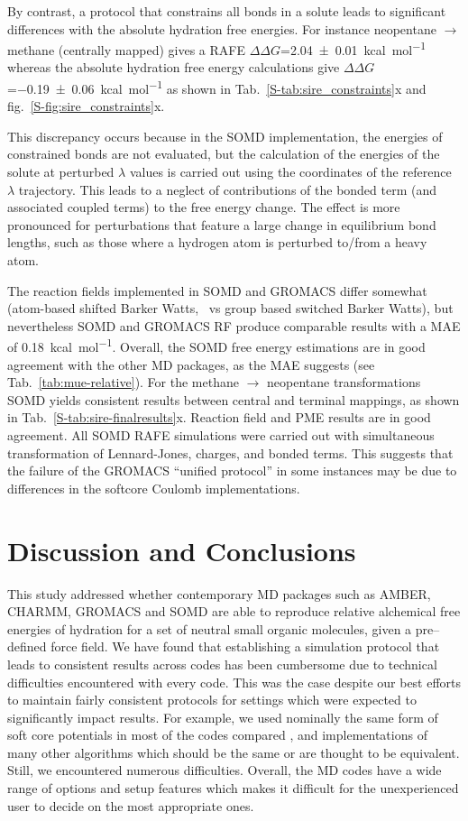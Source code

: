 \documentclass[journal=jctcce,manuscript=article]{achemso}
\begin{document}
By contrast, a protocol that constrains all bonds in a solute leads to
significant differences with the absolute hydration free energies. For instance
neopentane $\rightarrow$ methane (centrally mapped) gives a RAFE
$\Delta\Delta G$=\SI{2.04 +- 0.01}{kcal.mol^{-1}}  whereas the absolute
hydration free energy calculations give $\Delta\Delta
G$=\SI{-0.19+-0.06}{kcal.mol^{-1}} as shown in
Tab.~\ref{S-tab:sire_constraints}x and fig.~\ref{S-fig:sire_constraints}x.

This discrepancy occurs because in the SOMD implementation, the energies of constrained bonds are not evaluated, but the calculation of the energies of the solute at perturbed $\lambda$ values is carried out using the coordinates of the reference $\lambda$ trajectory. This leads to a neglect of contributions of
the bonded term (and associated coupled terms) to the free energy change. The effect is more pronounced for perturbations that feature a large change in equilibrium bond lengths, such as those where a hydrogen atom is perturbed
to/from a heavy atom.

The reaction fields implemented in SOMD and GROMACS differ somewhat (atom-based
shifted Barker Watts,~\cite{doi:10.1080/00268977300102101} vs group based switched Barker Watts), but nevertheless SOMD and GROMACS RF produce comparable results with a MAE of \SI{0.18}{kcal.mol^{-1}}. Overall, the SOMD free energy estimations are in good agreement with the other MD packages, as the MAE suggests (see Tab.~\ref{tab:mue-relative}). For the methane $\rightarrow$ neopentane transformations SOMD yields consistent results between central and terminal mappings, as shown in Tab.~\ref{S-tab:sire-finalresults}x.
Reaction field and PME results are in good agreement.  All SOMD RAFE simulations were carried out with simultaneous transformation of Lennard-Jones, charges, and bonded terms. This suggests that the failure of the GROMACS ``unified protocol'' in some instances may be due to differences in the softcore Coulomb implementations.


\section{Discussion and Conclusions}
\label{sec:discuss}

This study addressed whether contemporary MD packages such as AMBER, CHARMM, GROMACS and SOMD are able to reproduce relative alchemical free energies of hydration for a set of neutral small organic molecules, given a
pre--defined force field.
We have found that establishing a simulation protocol that leads to consistent results across codes has been cumbersome due to technical difficulties encountered with every code.
This was the case despite our best efforts to maintain fairly consistent protocols for settings which were expected to significantly impact results.
For example, we used nominally the same form of soft core potentials in most of the codes compared , and implementations of many other algorithms which should be the same or are thought to be equivalent.
Still, we encountered numerous difficulties.
Overall, the MD codes have a wide range of options and setup features which makes it difficult for the unexperienced user to decide on the most
appropriate ones.
\end{document}
